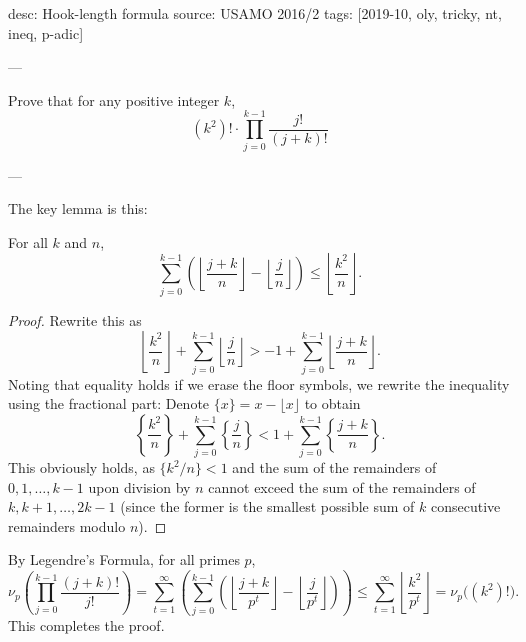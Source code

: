 desc: Hook-length formula
source: USAMO 2016/2
tags: [2019-10, oly, tricky, nt, ineq, p-adic]

---

Prove that for any positive integer $k$, \[(k^2)!\cdot\prod_{j=0}^{k-1}\frac{j!}{(j+k)!}\]

---

The key lemma is this:
\begin{boxlemma*}
    For all $k$ and $n$, \[\sum_{j=0}^{k-1}\left(\left\lfloor\frac{j+k}n\right\rfloor-\left\lfloor\frac jn\right\rfloor\right)\le\left\lfloor\frac{k^2}n\right\rfloor.\]
\end{boxlemma*}
\begin{proof}
    Rewrite this as \[\left\lfloor\frac{k^2}n\right\rfloor+\sum_{j=0}^{k-1}\left\lfloor\frac jn\right\rfloor>-1+\sum_{j=0}^{k-1}\left\lfloor\frac{j+k}n\right\rfloor.\]
    Noting that equality holds if we erase the floor symbols, we rewrite the inequality using the fractional part: Denote $\{x\}=x-\lfloor x\rfloor$ to obtain \[\left\{\frac{k^2}n\right\}+\sum_{j=0}^{k-1}\left\{\frac jn\right\}<1+\sum_{j=0}^{k-1}\left\{\frac{j+k}n\right\}.\]
This obviously holds, as $\{k^2/n\}<1$ and the sum of the remainders of $0,1,\ldots,k-1$ upon division by $n$ cannot exceed the sum of the remainders of $k,k+1,\ldots,2k-1$ (since the former is the smallest possible sum of $k$ consecutive remainders modulo $n$).
\end{proof}

By Legendre's Formula, for all primes $p$, \[\nu_p\left(\prod_{j=0}^{k-1}\frac{(j+k)!}{j!}\right)=\sum_{t=1}^\infty\left(\sum_{j=0}^{k-1}\left(\left\lfloor\frac{j+k}{p^t}\right\rfloor-\left\lfloor\frac j{p^t}\right\rfloor\right)\right)\le\sum_{t=1}^\infty\left\lfloor\frac{k^2}{p^t}\right\rfloor=\nu_p\Big((k^2)!\Big).\]
This completes the proof.

